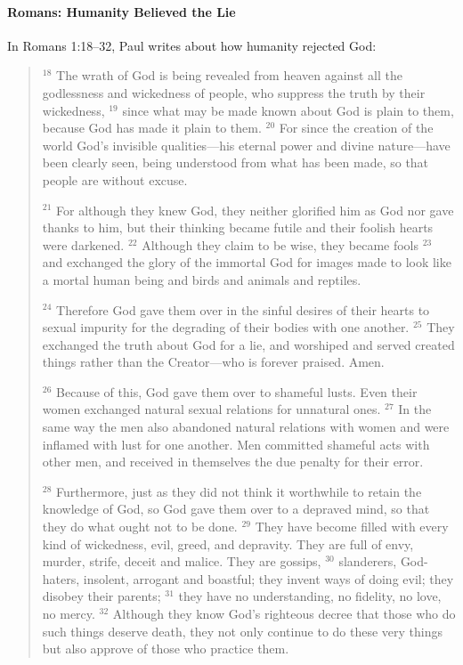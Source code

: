 \paragraph{Romans: Humanity Believed the Lie} In Romans 1:18--32, Paul writes
about how humanity rejected God:

\begin{quote}
    $^{18}$ The wrath of God is being revealed from heaven against all the
    godlessness and wickedness of people, who suppress the truth by their
    wickedness, $^{19}$ since what may be made known about God is plain to them,
    because God has made it plain to them. $^{20}$ For since the creation of the
    world God's invisible qualities---his eternal power and divine nature---have
    been clearly seen, being understood from what has been made, so that people
    are without excuse.

    $^{21}$ For although they knew God, they neither glorified him as God nor
    gave thanks to him, but their thinking became futile and their foolish
    hearts were darkened. $^{22}$ Although they claim to be wise, they became
    fools $^{23}$ and exchanged the glory of the immortal God for images made to
    look like a mortal human being and birds and animals and reptiles.

    $^{24}$ Therefore God gave them over in the sinful desires of their hearts
    to sexual impurity for the degrading of their bodies with one another.
    $^{25}$ They exchanged the truth about God for a lie, and worshiped and
    served created things rather than the Creator---who is forever praised.
    Amen.

    $^{26}$ Because of this, God gave them over to shameful lusts. Even their
    women exchanged natural sexual relations for unnatural ones. $^{27}$ In the
    same way the men also abandoned natural relations with women and were
    inflamed with lust for one another. Men committed shameful acts with other
    men, and received in themselves the due penalty for their error.

    $^{28}$ Furthermore, just as they did not think it worthwhile to retain the
    knowledge of God, so God gave them over to a depraved mind, so that they do
    what ought not to be done. $^{29}$ They have become filled with every kind
    of wickedness, evil, greed, and depravity. They are full of envy, murder,
    strife, deceit and malice. They are gossips, $^{30}$ slanderers, God-haters,
    insolent, arrogant and boastful; they invent ways of doing evil; they
    disobey their parents; $^{31}$ they have no understanding, no fidelity, no
    love, no mercy. $^{32}$ Although they know God's righteous decree that those
    who do such things deserve death, they not only continue to do these very
    things but also approve of those who practice them.
\end{quote}

